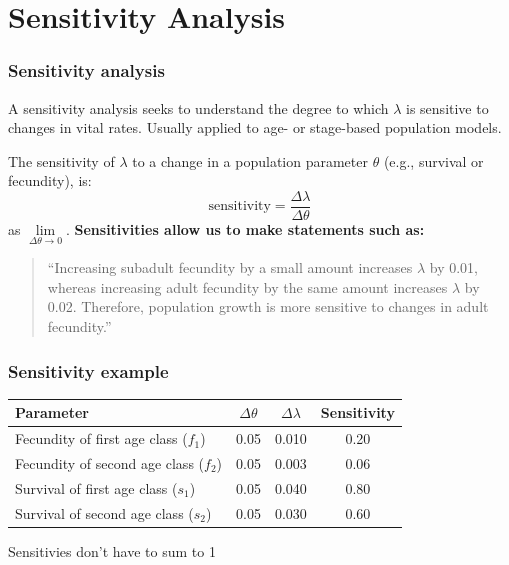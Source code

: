 \documentclass[color=usenames,dvipsnames]{beamer}\usepackage[]{graphicx}\usepackage[]{color}
\begin{document}
\section{Sensitivity Analysis}


\begin{frame}
  \frametitle{Sensitivity analysis}
  A sensitivity analysis seeks to understand the degree to which
  $\lambda$ is sensitive to changes in vital rates.
  \pause
  \vfill
  Usually applied to age- or stage-based population models. \par
  \pause
  \vfill
  The sensitivity of $\lambda$ to a change in a population parameter
  $\theta$ (e.g., survival or fecundity), is:
  \[
    \text{sensitivity} = \frac{\Delta \lambda}{\Delta \theta}
  \]
  as $\lim\limits_{\Delta \theta \to 0}$. 
  \pause
  \vfill
  {\bf Sensitivities allow us to make statements such as:} \\
  \begin{quote}
  ``Increasing subadult fecundity by a small amount increases
  $\lambda$ by 0.01, whereas increasing adult fecundity by the same
  amount increases $\lambda$ by 0.02. Therefore, population growth is
  more sensitive to changes in adult fecundity.''
  \end{quote}
\end{frame}



\begin{frame}
  \frametitle{Sensitivity example}
  \centering
  \small
  \begin{tabular}{lccc}
    \hline
    Parameter & $\Delta \theta$ & $\Delta \lambda$ & Sensitivity \\
    \hline
    Fecundity of first age class ($f_1$)  & 0.05 & 0.010 & 0.20 \\ %
    Fecundity of second age class ($f_2$) & 0.05 & 0.003 & 0.06 \\ %
    Survival of first age class ($s_1$)   & 0.05 & 0.040 & 0.80 \\ %
    Survival of second age class ($s_2$)   & 0.05 & 0.030 & 0.60 \\
    \hline
  \end{tabular}
  \vfill
  \normalsize
  \centering Sensitivies don't have to sum to 1 \par
\end{frame}
\end{document}
